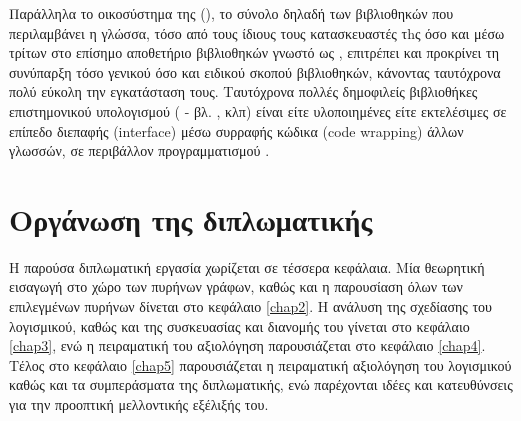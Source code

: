 Παράλληλα το οικοσύστημα της  (), το σύνολο δηλαδή των βιβλιοθηκών που περιλαμβάνει η γλώσσα, τόσο από τους ίδιους τους κατασκευαστές τhς όσο και μέσω τρίτων στο επίσημο αποθετήριο βιβλιοθηκών γνωστό ως , επιτρέπει και προκρίνει τη συνύπαρξη τόσο γενικού όσο και ειδικού σκοπού βιβλιοθηκών, κάνοντας ταυτόχρονα πολύ εύκολη την εγκατάσταση τους.
Ταυτόχρονα πολλές δημοφιλείς βιβλιοθήκες επιστημονικού υπολογισμού ( - βλ. ,  κλπ) είναι είτε υλοποιημένες είτε εκτελέσιμες σε επίπεδο διεπαφής (interface) μέσω συρραφής κώδικα (code wrapping) άλλων γλωσσών, σε περιβάλλον προγραμματισμού .

\section{Οργάνωση της διπλωματικής}
Η παρούσα διπλωματική εργασία χωρίζεται σε τέσσερα κεφάλαια. Μία θεωρητική εισαγωγή στο χώρο των πυρήνων γράφων, καθώς και η παρουσίαση όλων των επιλεγμένων πυρήνων δίνεται στο κεφάλαιο \ref{chap2}. Η ανάλυση της σχεδίασης του λογισμικού, καθώς και της συσκευασίας και διανομής του γίνεται στο κεφάλαιο \ref{chap3}, ενώ η πειραματική του αξιολόγηση παρουσιάζεται στο κεφάλαιο \ref{chap4}. Τέλος στο κεφάλαιο \ref{chap5} παρουσιάζεται η πειραματική αξιολόγηση του λογισμικού καθώς και τα συμπεράσματα της διπλωματικής, ενώ παρέχονται ιδέες και κατευθύνσεις για την προοπτική μελλοντικής εξέλιξής του.
